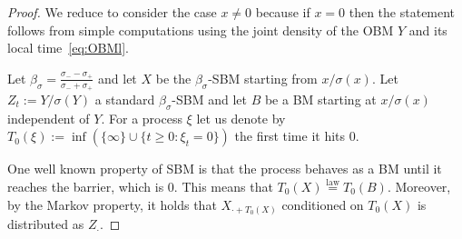 \documentclass[12pt]{article}
\numberwithin{equation}{section}
\theoremstyle{definition}
\theoremstyle{remark}
\def\eqlaw{\stackrel{\mathrm{law}}{=}}
\begin{document}
\begin{proof}
We reduce to consider the case $x\neq 0$ because if $x=0$ then the statement follows from simple computations using the joint density of the OBM $Y$ and its local time~\eqref{eq:OBMl}.

Let $\beta_\sigma= \frac{\sigma_- - \sigma_+}{\sigma_- + \sigma_+}$ and let $X$ be the ${\beta_\sigma}$-SBM starting from $x/\sigma(x)$. 
%
Let $Z_t:=Y/\sigma(Y)$ a standard ${\beta_\sigma}$-SBM and let $B$ be a BM starting at $x/\sigma(x)$ independent of $Y$.
For a process $\xi$ let us denote by
$
	T_0(\xi):= \inf(\{\infty\}\cup \{t \geq 0 \colon \xi_t = 0\})
$
the first time it hits 0.

One well known property of SBM is that the process behaves as a BM until it reaches the barrier, which is 0. This means that $T_0(X) \eqlaw T_0(B)$.
Moreover, by the Markov property, it holds that
$X_{\cdot+T_0\left(X\right)}$ conditioned on $T_0\left(X\right)$ is distributed as $Z_\cdot$.


\end{proof}
\end{document}
